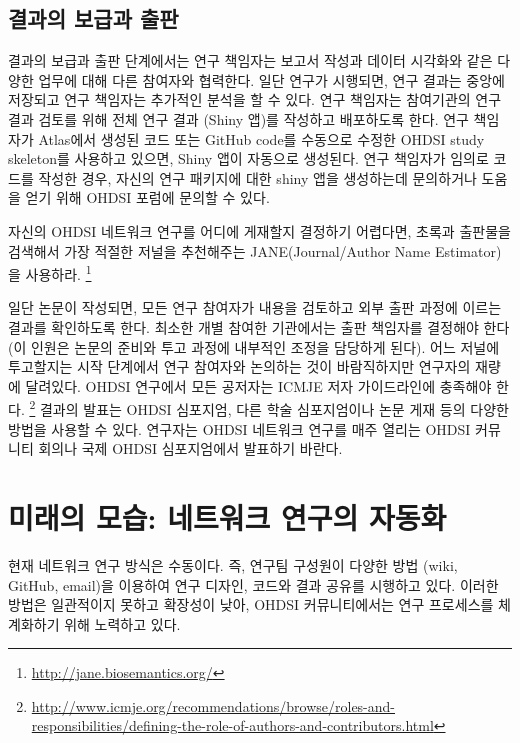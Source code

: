 \documentclass[10.5pt]{book}
\let\rmarkdownfootnote\footnote%
\def\footnote{\protect\rmarkdownfootnote}
\theoremstyle{definition}
\theoremstyle{definition}
\theoremstyle{definition}
\theoremstyle{remark}
\let\BeginKnitrBlock\begin \let\EndKnitrBlock\end
\begin{document}
\subsection{결과의 보급과 출판}\label{--}

결과의 보급과 출판 단계에서는 연구 책임자는 보고서 작성과 데이터
시각화와 같은 다양한 업무에 대해 다른 참여자와 협력한다. 일단 연구가
시행되면, 연구 결과는 중앙에 저장되고 연구 책임자는 추가적인 분석을 할
수 있다. 연구 책임자는 참여기관의 연구 결과 검토를 위해 전체 연구 결과
(Shiny 앱)를 작성하고 배포하도록 한다. 연구 책임자가 Atlas에서 생성된
코드 또는 GitHub code를 수동으로 수정한 OHDSI study skeleton를 사용하고
있으면, Shiny 앱이 자동으로 생성된다. 연구 책임자가 임의로 코드를 작성한
경우, 자신의 연구 패키지에 대한 shiny 앱을 생성하는데 문의하거나 도움을
얻기 위해 OHDSI 포럼에 문의할 수 있다.

\BeginKnitrBlock{rmdimportant}
자신의 OHDSI 네트워크 연구를 어디에 게재할지 결정하기 어렵다면, 초록과
출판물을 검색해서 가장 적절한 저널을 추천해주는 JANE(Journal/Author Name
Estimator)을 사용하라. \footnote{\url{http://jane.biosemantics.org/}}
\EndKnitrBlock{rmdimportant}

일단 논문이 작성되면, 모든 연구 참여자가 내용을 검토하고 외부 출판
과정에 이르는 결과를 확인하도록 한다. 최소한 개별 참여한 기관에서는 출판
책임자를 결정해야 한다(이 인원은 논문의 준비와 투고 과정에 내부적인
조정을 담당하게 된다). 어느 저널에 투고할지는 시작 단계에서 연구
참여자와 논의하는 것이 바람직하지만 연구자의 재량에 달려있다. OHDSI
연구에서 모든 공저자는 ICMJE 저자 가이드라인에 충족해야 한다. \footnote{\url{http://www.icmje.org/recommendations/browse/roles-and-responsibilities/defining-the-role-of-authors-and-contributors.html}}
결과의 발표는 OHDSI 심포지엄, 다른 학술 심포지엄이나 논문 게재 등의
다양한 방법을 사용할 수 있다. 연구자는 OHDSI 네트워크 연구를 매주 열리는
OHDSI 커뮤니티 회의나 국제 OHDSI 심포지엄에서 발표하기 바란다.

\section{미래의 모습: 네트워크 연구의 자동화}\label{----}


현재 네트워크 연구 방식은 수동이다. 즉, 연구팀 구성원이 다양한 방법
(wiki, GitHub, email)을 이용하여 연구 디자인, 코드와 결과 공유를
시행하고 있다. 이러한 방법은 일관적이지 못하고 확장성이 낮아, OHDSI
커뮤니티에서는 연구 프로세스를 체계화하기 위해 노력하고 있다.
\end{document}
